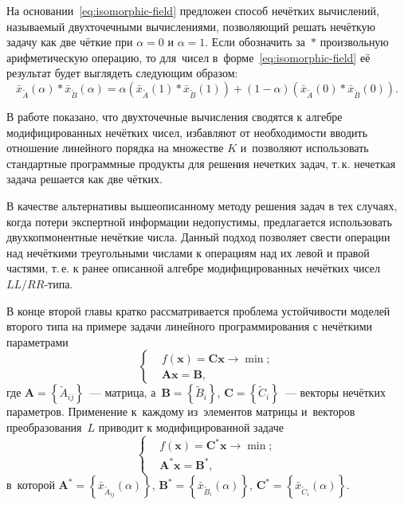 На основании~\eqref{eq:isomorphic-field} предложен способ нечётких вычислений, называемый двухточечными вычислениями, позволяющий решать нечёткую задачу как две чёткие при $\alpha=0$ и $\alpha=1$. Если обозначить за~$*$ произвольную арифметическую операцию, то для~чисел в~форме~\eqref{eq:isomorphic-field} её результат будет выглядеть следующим образом:
\begin{equation}
\label{eq:two-point-calculations}
  \bar{x}_{\tilde A}\left( \alpha \right)*\bar{x}_{\tilde B}\left(\alpha \right)=\alpha \left(\bar{x}_{\tilde A}\left( 1 \right)*\bar{x}_{\tilde B}\left(1 \right) \right)+\left(1-\alpha \right)\left(\bar{x}_{\tilde A}\left(0 \right)*\bar{x}_{\tilde B}\left(0 \right) \right).
\end{equation}

В работе показано, что двухточечные вычисления сводятся к алгебре модифицированных нечётких чисел, избавляют от необходимости вводить отношение линейного порядка на множестве $K$ и~позволяют использовать стандартные программные продукты для решения нечетких задач, т.\,к. нечеткая задача решается как две чётких.

В качестве альтернативы вышеописанному методу решения задач в тех случаях, когда потери экспертной информации недопустимы, предлагается использовать двухкопмонентные нечёткие числа. Данный подход позволяет свести операции над нечёткими треугольными числами к операциям над их левой и правой частями, т.\,е. к ранее описанной алгебре модифицированных нечётких чисел $LL/RR$-типа.

В конце второй главы кратко рассматривается проблема устойчивости моделей второго типа на примере задачи линейного программирования с нечёткими параметрами
\begin{equation*}
  \left\{ \begin{aligned}
    & f\left( \mathbf{x} \right)=\mathbf{Cx}\to \min;  \\ 
    & \mathbf{Ax}=\mathbf{B},
  \end{aligned} \right.
\end{equation*}
где $\mathbf{A}=\left\{ \tilde{A}_{ij} \right\}$~--- матрица, а~$\mathbf{B}=\left\{ \tilde{B}_i \right\}$, $\mathbf{C}=\left\{\tilde{C}_i \right\}$~--- векторы нечётких параметров. 
Применение к~каждому из~элементов матрицы и~векторов преобразования~$L$ приводит к модифицированной задаче
\begin{equation}
\label{eq:fuzzy-lp-unstable-problem}
  \left\{ \begin{aligned}
    & f\left( \mathbf{x} \right)={\mathbf{C}^{*}}\mathbf{x}\to \min;  \\ 
    & {\mathbf{A}^{*}}\mathbf{x}={\mathbf{B}}^{*},
  \end{aligned} \right.
\end{equation}
в~которой $\mathbf{A}^{*}=\left\{ \bar{x}_{\tilde{A}_{ij}}\left(\alpha \right) \right\}$, $\mathbf{B}^{*}=\left\{ \bar{x}_{\tilde{B}_i}\left(\alpha \right) \right\}$, $\mathbf{C}^{*}=\left\{ \bar{x}_{\tilde{C}_i}\left(\alpha \right) \right\}$.

